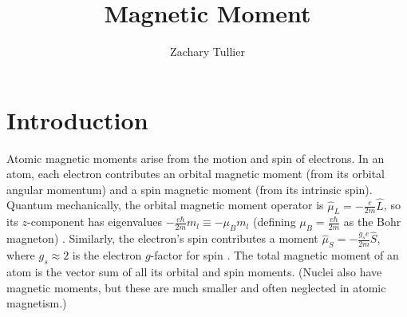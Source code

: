 \documentclass[12pt]{article}
\begin{document}
\singlespacing  %
\title{Magnetic Moment}

\author[1]{Zachary Tullier}
\date{}
\maketitle

\section{Introduction}
    Atomic magnetic moments arise from the motion and spin of electrons. In an atom, each electron contributes an orbital magnetic moment (from its orbital angular momentum) and a spin magnetic moment (from its intrinsic spin). Quantum mechanically, the orbital magnetic moment operator is $\hat{\mu}_L = -\frac{e}{2m}\hat{L}$, so its $z$-component has eigenvalues $- \frac{e\hbar}{2m} m_l \equiv -\mu_B m_l$ (defining $\mu_B = \frac{e\hbar}{2m}$ as the Bohr magneton) \cite{PerturbationTheory}. Similarly, the electron’s spin contributes a moment $\hat{\mu}_S = -\frac{g_s e}{2m}\hat{S}$, where $g_s\approx 2$ is the electron $g$-factor for spin \cite{PerturbationTheory}. The total magnetic moment of an atom is the vector sum of all its orbital and spin moments. (Nuclei also have magnetic moments, but these are much smaller and often neglected in atomic magnetism.)
    
\end{document}
